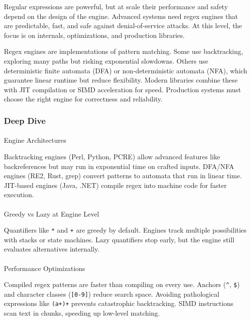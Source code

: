 \documentclass[
  letterpaper,
  DIV=11,
  numbers=noendperiod]{scrreprt}
\makeatletter
\let\oldparagraph\paragraph
\renewcommand{\paragraph}{
    \@ifstar
      \xxxParagraphStar
      \xxxParagraphNoStar
  }
\newcommand{\xxxParagraphStar}[1]{\oldparagraph*{#1}\mbox{}}
\newcommand{\xxxParagraphNoStar}[1]{\oldparagraph{#1}\mbox{}}
\makeatother
\begin{document}
Regular expressions are powerful, but at scale their performance and
safety depend on the design of the engine. Advanced systems need regex
engines that are predictable, fast, and safe against denial-of-service
attacks. At this level, the focus is on internals, optimizations, and
production libraries.

Regex engines are implementations of pattern matching. Some use
backtracking, exploring many paths but risking exponential slowdowns.
Others use deterministic finite automata (DFA) or non-deterministic
automata (NFA), which guarantee linear runtime but reduce flexibility.
Modern libraries combine these with JIT compilation or SIMD acceleration
for speed. Production systems must choose the right engine for
correctness and reliability.

\subsubsection{Deep Dive}\label{deep-dive-33}

\paragraph{Engine Architectures}\label{engine-architectures}

Backtracking engines (Perl, Python, PCRE) allow advanced features like
backreferences but may run in exponential time on crafted inputs.
DFA/NFA engines (RE2, Rust, grep) convert patterns to automata that run
in linear time. JIT-based engines (Java, .NET) compile regex into
machine code for faster execution.

\paragraph{Greedy vs Lazy at Engine
Level}\label{greedy-vs-lazy-at-engine-level}

Quantifiers like \texttt{*} and \texttt{+} are greedy by default.
Engines track multiple possibilities with stacks or state machines. Lazy
quantifiers stop early, but the engine still evaluates alternatives
internally.

\paragraph{Performance Optimizations}\label{performance-optimizations}

Compiled regex patterns are faster than compiling on every use. Anchors
(\texttt{\^{}}, \texttt{\$}) and character classes (\texttt{{[}0-9{]}})
reduce search space. Avoiding pathological expressions like
\texttt{(a+)+} prevents catastrophic backtracking. SIMD instructions
scan text in chunks, speeding up low-level matching.
\end{document}
